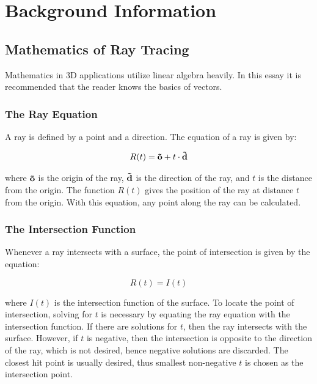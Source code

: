 \documentclass[12pt]{article}
\begin{document}
\section{Background Information}

\subsection{Mathematics of Ray Tracing}

Mathematics in 3D applications utilize linear algebra heavily.
In this essay it is recommended that the reader knows the basics of vectors.

\subsubsection{The Ray Equation}

A ray is defined by a point and a direction. The equation of a ray is given by:

\begin{equation}
    R(t) = {\bf\vec{o}} + t \cdot {\bf\vec{d}}
\end{equation}

where $\bf{\vec{o}}$ is the origin of the ray, $\bf{\vec{d}}$ is the direction of the ray, and $t$ is the distance from the origin.
The function $R(t)$ gives the position of the ray at distance $t$ from the origin.
With this equation, any point along the ray can be calculated.

\subsubsection{The Intersection Function}

Whenever a ray intersects with a surface, the point of intersection is given by the equation:

\begin{equation}
    R(t) = I(t)
\end{equation}

where $I(t)$ is the intersection function of the surface. To locate the point of intersection,
solving for $t$ is necessary by equating the ray equation with the intersection function.
If there are solutions for $t$, then the ray intersects with the surface. However,
if $t$ is negative, then the intersection is opposite to the direction of the ray, which is not desired,
hence negative solutions are discarded. The closest hit point is usually desired, thus smallest non-negative $t$ is chosen as
the intersection point.
\end{document}
